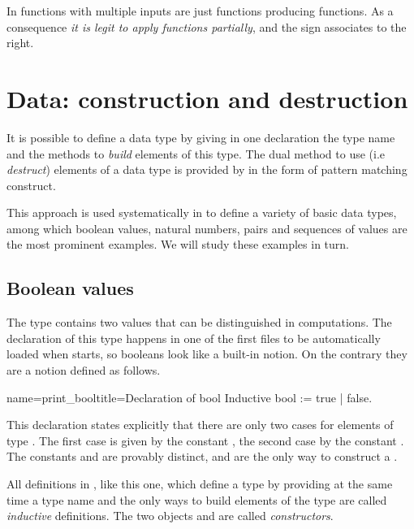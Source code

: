 In \Coq{} functions with multiple inputs are just functions producing
functions.  As a consequence \emph{it is legit to apply functions partially},
and the \C{->} sign associates to the right.

\section{Data: construction and destruction}
It is possible to define a data type by giving in one declaration
the type name and the methods to \emph{build} elements of this type.
The dual method to use (i.e \emph{destruct})
elements of a data type is provided by
\Coq{} in the form of pattern matching construct.

This approach is used
systematically in \Coq{} to define a variety of basic data types, among
which boolean values, natural numbers, pairs and sequences of values
are the most prominent examples.  We will study these examples in
turn.

\subsection{Boolean values}
The type  contains two values that can be
distinguished in computations.  The declaration of this type happens
in one of the first files to be automatically loaded when \Coq{} starts,
so booleans look like a built-in notion.  On the contrary they are a
notion defined as follows.

\begin{coq}{name=print_bool}{title=Declaration of bool}
Inductive bool := true | false.
\end{coq}
This declaration states explicitly that there are only two cases for
elements of type .  The first case is given by the constant
, the second case by the constant .  
The constants  and  are provably distinct, and
are the only way to construct a .

All definitions
in \Coq{}, like this one, which define a type by providing at the same time a type
name and the only ways to build elements of the type are called {\em inductive}
definitions.  The two objects  and  are called
\emph{constructors}.


